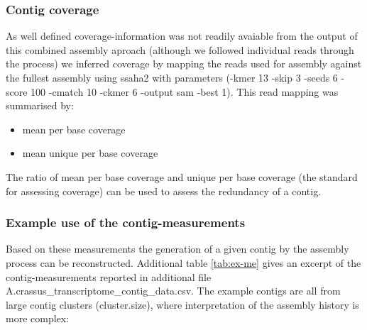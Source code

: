 \documentclass[12pt,a4paper]{article}
\begin{document}
\subsubsection{Contig coverage}



As well defined coverage-information was not readily avaiable from the
output of this combined assembly aproach (although we followed
individual reads through the process) we inferred coverage by mapping
the reads used for assembly against the fullest assembly using ssaha2
\cite{pmid11591649} with parameters (-kmer 13 -skip 3 -seeds 6 -score
100 -cmatch 10 -ckmer 6 -output sam -best 1). This read mapping was
summarised by:

\begin{itemize}
\item mean per base coverage
\item mean unique per base coverage
\end{itemize}

The ratio of mean per base coverage and unique per base coverage (the
standard for assessing coverage) can be used to assess the redundancy
of a contig.

\subsubsection{Example use of the contig-measurements}

Based on these measurements the generation of a given contig by the
assembly process can be reconstructed. Additional table
\ref{tab:ex-me} gives an excerpt of the contig-measurements reported
in additional file A.crassus\_transcriptome\_contig\_data.csv. The
example contigs are all from large contig clusters (cluster.size),
where interpretation of the assembly history is more complex:
\end{document}
